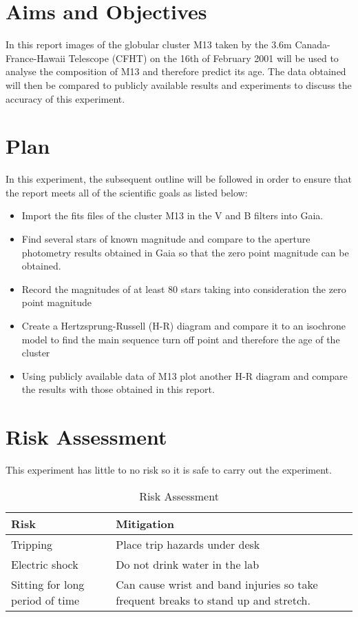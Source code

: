 \documentclass[10pt]{article}
\begin{document}
\section{Aims and Objectives}
In this report images of the globular cluster M13 taken by the 3.6m Canada-France-Hawaii Telescope (CFHT) on the 16th of February 2001 will be used to analyse the composition of M13 and therefore predict its age. The data obtained will then be compared to publicly available results and experiments to discuss the accuracy of this experiment.
\section{Plan}
In this experiment, the subsequent outline will be followed in order to ensure that the report meets all of the scientific goals as listed below:
\begin{itemize}
	\item Import the fits files of the cluster M13 in the V and B filters into Gaia.
	\item Find several stars of known magnitude and compare to the aperture photometry results obtained in Gaia so that the zero point magnitude can be obtained.
	\item Record the magnitudes of at least 80 stars taking into consideration the zero point magnitude
	\item Create a Hertzsprung-Russell (H-R) diagram and compare it to an isochrone model to find the main sequence turn off point and therefore the age of the cluster
	\item Using publicly available data of M13 plot another H-R diagram and compare the results with those obtained in this report.
\end{itemize}
\section{Risk Assessment}
This experiment has little to no risk so it is safe to carry out the experiment.
\begin{table}[H]
	\centering
	\caption{Risk Assessment}
	\begin{tabular}{p{}p{}}
		\toprule
		Risk & Mitigation \\
		\midrule
		Tripping & Place trip hazards under desk \\
		\addlinespace
		\cellcolor{gray!10} Electric shock & \cellcolor{gray!10} Do not drink water in the lab \\
		\addlinespace
		Sitting for long period of time & Can cause wrist and band injuries so take frequent breaks to stand up and stretch. \\
		\bottomrule
	\end{tabular}
\end{table}
\pagebreak
\end{document}
